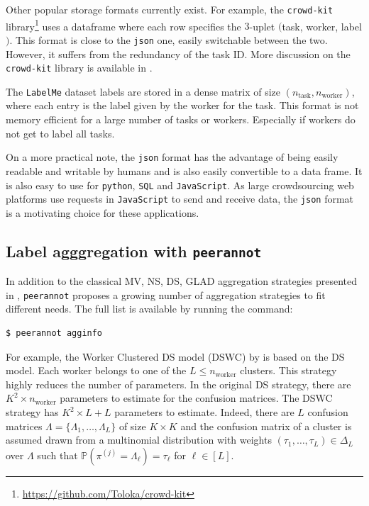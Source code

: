Other popular storage formats currently exist.
For example, the \texttt{crowd-kit} library\footnote{\url{https://github.com/Toloka/crowd-kit}} uses a dataframe where each row specifies the $3$-uplet $($task, worker, label$)$.
This format is close to the \texttt{json} one, easily switchable between the two. However, it suffers from the redundancy of the task ID.
More discussion on the \texttt{crowd-kit} library is available in .

The \texttt{LabelMe} dataset labels are stored in a dense matrix of size $(n_{\text{task}}, n_{\text{worker}})$, where each entry is the label given by the worker for the task. This format is not memory efficient for a large number of tasks or workers. Especially if workers do not get to label all tasks.

On a more practical note, the \texttt{json} format has the advantage of being easily readable and writable by humans and is also easily convertible to a data frame. It is also easy to use for \texttt{python}, \texttt{SQL} and \texttt{JavaScript}.
As large crowdsourcing web platforms use requests in \texttt{JavaScript} to send and receive data, the \texttt{json} format is a motivating choice for these applications.

\subsection{Label agggregation with \texttt{peerannot}}

In addition to the classical MV, NS, DS, GLAD aggregation strategies presented in , \texttt{peerannot} proposes a growing number of aggregation strategies to fit different needs.
The full list is available by running the command:

\begin{verbatim}
$ peerannot agginfo
\end{verbatim}


For example, the Worker Clustered DS model (DSWC) by \citet{imamura2018analysis} is based on the DS model.
Each worker belongs to one of the $L\leq n_{\text{worker}}$ clusters.
This strategy highly reduces the number of parameters.
In the original DS strategy, there are $K^2\times n_{\text{worker}}$ parameters to estimate for the confusion matrices. The DSWC strategy has $K^2\times L + L$ parameters to estimate.
Indeed, there are $L$ confusion matrices $\Lambda=\{\Lambda_1,\dots,\Lambda_L\}$ of size $K\times K$ and the confusion matrix of a cluster is assumed drawn from a multinomial distribution with weights $(\tau_1,\dots,\tau_L)\in\Delta_L$ over $\Lambda$ such that $\mathbb{P}(\pi^{(j)}=\Lambda_\ell)=\tau_\ell$ for $\ell \in [L]$.

